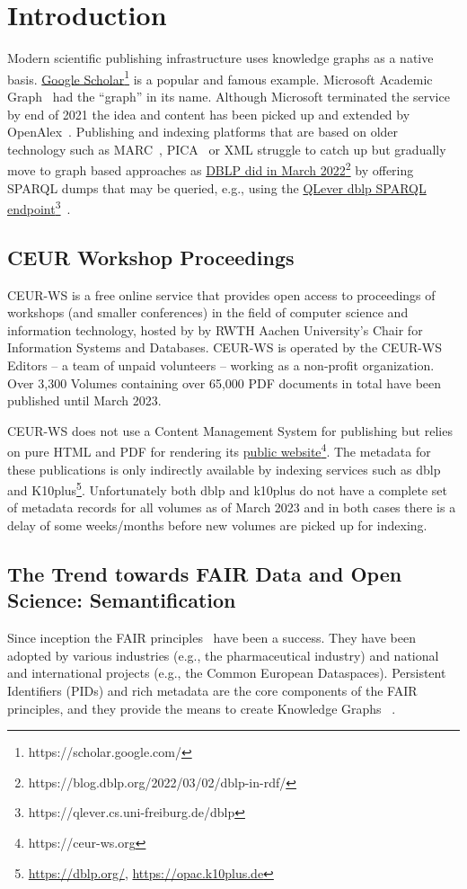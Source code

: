 \documentclass[]{ceurart}
\newcommand{\tquote}[1]{``#1''}
\newcommand{\footnotelink}[2]{\href{#1}{#2}\footnote{#1}}
\begin{document}
\section{Introduction}\label{sec:Introduction}
Modern scientific publishing infrastructure uses knowledge graphs as a native basis. \footnotelink{https://scholar.google.com/}{Google Scholar} is a popular and famous example. Microsoft Academic Graph~\cite{Wang2020} had the \tquote{graph} in its name. Although Microsoft terminated the service by end of 2021 the idea and content has been picked up and extended by OpenAlex~\cite{Priem2022}. Publishing and indexing platforms that are based on older technology such as MARC~\cite{Ganseman2015}, PICA~\cite{Costers1997} or XML struggle to catch up but gradually move to graph based approaches as  \footnotelink{https://blog.dblp.org/2022/03/02/dblp-in-rdf/}{DBLP did in March 2022} by offering SPARQL dumps that may be queried, e.g., using the \footnotelink{https://qlever.cs.uni-freiburg.de/dblp}{QLever dblp SPARQL endpoint}~\cite{Bast2017}.

\subsection{CEUR Workshop Proceedings}
CEUR-WS is a free online service that provides open access to  proceedings of workshops (and smaller conferences) in the field of computer science and information technology, hosted by by RWTH Aachen University's Chair for Information Systems and Databases. CEUR-WS is operated by the CEUR-WS Editors -- a team of unpaid volunteers -- working as a non-profit organization. Over 3,300 Volumes containing over 65,000 PDF documents in total have been published until March 2023.

CEUR-WS does not use a Content Management System for publishing but relies on pure HTML and PDF for rendering its \footnotelink{https://ceur-ws.org}{public website}. The metadata for these publications is only indirectly available by indexing services such as dblp~\cite{Ley2009} and {K10plus}\cite{k10plus2019}\footnote{\url{https://dblp.org/}, \url{https://opac.k10plus.de}}. Unfortunately both dblp and k10plus do not have a complete set of metadata records for all volumes as of March 2023 and in both cases there is a delay of some weeks/months before new volumes are picked up for indexing.

\subsection{The Trend towards FAIR Data and Open Science: Semantification}
Since inception the FAIR principles~\cite{Wilkinson2016} have been a  success. They have been adopted by various industries (e.g., the pharmaceutical industry) and national and international projects (e.g., the Common European Dataspaces). 
Persistent Identifiers (PIDs) and rich metadata are the core components of the FAIR principles, and they provide the means to create Knowledge Graphs~\cite{Cousijn2021} .
\end{document}
